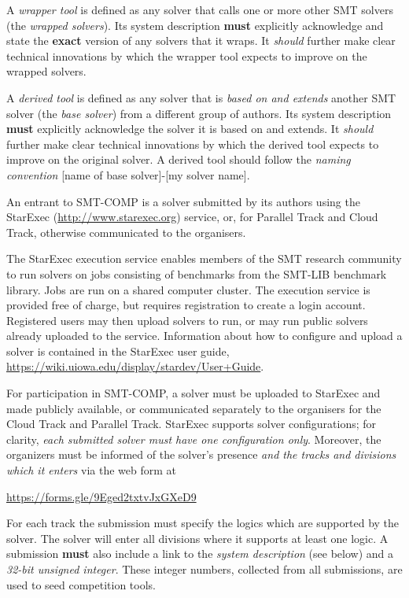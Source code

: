 \documentclass[12pt]{article}
\newcommand{\paralleltrack}{Parallel Track\xspace}
\newcommand{\cloudtrack}{Cloud Track\xspace}
\begin{document}
%
A \emph{wrapper tool} is defined as any solver that calls one or more other SMT
solvers (the \emph{wrapped solvers}). Its system description \textbf{must}
explicitly acknowledge and state the \textbf{exact} version of any solvers that
it wraps.  It \emph{should} further make clear technical innovations by which
the wrapper tool expects to improve on the wrapped solvers.

%
A \emph{derived tool} is defined as any solver that is \emph{based on and
extends} another SMT solver (the \emph{base solver}) from a different
group of authors.  Its system description
\textbf{must} explicitly acknowledge
the solver it is based on and extends.  It \emph{should} further make clear
technical innovations by which the derived tool expects to improve on the
original solver.  A derived tool should follow the \emph{naming convention}
{[name of base solver]-[my solver name]}.

%
An entrant to SMT-COMP is a solver submitted by its authors using
the StarExec (\url{http://www.starexec.org}) service, or, for
\paralleltrack{} and \cloudtrack{}, otherwise communicated to the
organisers.


%
The StarExec execution
service enables members of the SMT research community to run solvers
on jobs consisting of benchmarks from the SMT-LIB benchmark library.
Jobs are run on a shared computer cluster.  The execution service is
provided free of charge, but requires registration to create a
login account.  Registered users may then upload solvers to
run, or may run public solvers already uploaded to the service.
Information about how to configure and upload a solver is contained in
the StarExec user guide,
\url{https://wiki.uiowa.edu/display/stardev/User+Guide}.

%
For participation in SMT-COMP, a solver must be uploaded to StarExec
and made publicly available, or communicated separately to the
organisers for the \cloudtrack{} and \paralleltrack{}.  StarExec supports solver configurations;
for clarity, \emph{each submitted solver must have one configuration
  only}.  Moreover, the organizers must be informed of the solver's
presence \emph{and the tracks and divisions which it enters} via the
web form at
\begin{center}
  \url{https://forms.gle/9Eged2txtvJxGXeD9}
\end{center}
For each track the submission must specify the logics which are
supported by the solver.  The solver will enter all divisions where it
supports at least one logic.  A submission \textbf{must} also include a
link to the \emph{system description} (see below) and a \emph{32-bit
  unsigned integer}.  These integer numbers, collected from all
submissions, are used to seed competition tools.
\end{document}
